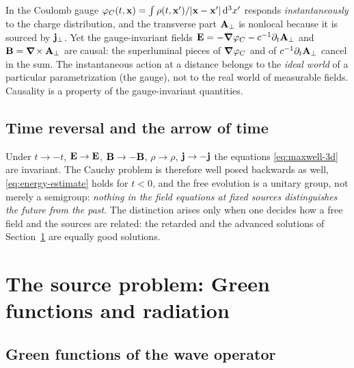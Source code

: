 \begin{remark}
In the Coulomb gauge $\varphi_C(t,\mathbf{x})=\int\rho(t,\mathbf{x}')/|\mathbf{x}-\mathbf{x}'|\,\mathrm{d}^3x'$ responds
\emph{instantaneously} to the charge distribution, and the transverse part
$\mathbf{A}_\perp$ is nonlocal because it is sourced by $\mathbf{j}_\perp$.  Yet
the gauge-invariant fields $\mathbf{E}=-\boldsymbol{\nabla}\varphi_C-c^{-1}\partial_t\mathbf{A}_\perp$ and
$\mathbf{B}=\boldsymbol{\nabla}\!\times\mathbf{A}_\perp$ are causal: the superluminal pieces of $\boldsymbol{\nabla}\varphi_C$ and of
$c^{-1}\partial_t\mathbf{A}_\perp$ cancel in the sum.  The instantaneous action at
a distance belongs to the \emph{ideal world} of a particular
parametrization (the gauge), not to the real world of measurable
fields.  Causality is a property of the gauge-invariant quantities.
\end{remark}

\subsection{Time reversal and the arrow of time}

Under $t\to-t$, $\mathbf{E}\to\mathbf{E}$, $\mathbf{B}\to-\mathbf{B}$, $\rho\to\rho$, $\mathbf{j}\to-\mathbf{j}$ the equations
\eqref{eq:maxwell-3d} are invariant.  The Cauchy problem is therefore
well posed backwards as well, \eqref{eq:energy-estimate} holds for $t<0$, and
the free evolution is a unitary group, not merely a semigroup:
\emph{nothing in the field equations at fixed sources distinguishes
the future from the past}.  The distinction arises only when one decides
how a free field and the sources are related: the retarded and the
advanced solutions of Section~\ref{sec:mx-sources} are equally good solutions.

\section{The source problem: Green functions and radiation}\label{sec:mx-sources}

\subsection{Green functions of the wave operator}

